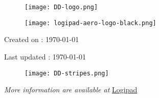 
        \begin{titlepage}
            \centering
            \vspace*{0mm} %
            \begin{figure}[!h]
                \vspace*{-20mm}
                \texttt{[image: DD-logo.png]}
            \end{figure}
            \vspace{30mm} %
            \begin{figure}[!h]
                \centering
                \texttt{[image: logipad-aero-logo-black.png]}
            \end{figure}

            \vspace{10mm} 

            \vspace{30mm}

            \small Created on : \today

            \vspace*{0mm}
            \small  Last updated : \MonthYearFormat\today
            
            \vspace{50mm}
            \begin{figure}[!h]
                \hspace*{-20mm}
                \texttt{[image: DD-stripes.png]}
            \end{figure}
            \vfill
            \small \textit{More information are available at }{\href{http://www.logipad.aero}{Logipad}}
        \end{titlepage}

        \tableofcontents
        \listoffigures
        \listoftables
        \clearpage
